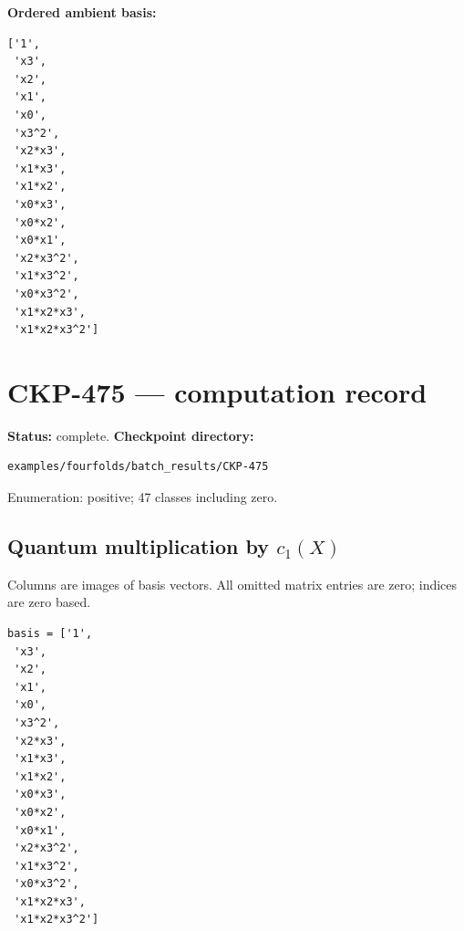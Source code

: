 \documentclass[10pt,a4paper]{article}
\begin{document}
\textbf{Ordered ambient basis:}
\begin{lstlisting}
['1',
 'x3',
 'x2',
 'x1',
 'x0',
 'x3^2',
 'x2*x3',
 'x1*x3',
 'x1*x2',
 'x0*x3',
 'x0*x2',
 'x0*x1',
 'x2*x3^2',
 'x1*x3^2',
 'x0*x3^2',
 'x1*x2*x3',
 'x1*x2*x3^2']
\end{lstlisting}

\clearpage\section*{CKP-475 --- computation record}
\textbf{Status:} complete.
\textbf{Checkpoint directory:}
\begin{lstlisting}
examples/fourfolds/batch_results/CKP-475
\end{lstlisting}

Enumeration: positive; 47 classes including zero.
\subsection*{Quantum multiplication by $c_1(X)$}
Columns are images of basis vectors. All omitted matrix entries are zero; indices are zero based.

\begin{lstlisting}
basis = ['1',
 'x3',
 'x2',
 'x1',
 'x0',
 'x3^2',
 'x2*x3',
 'x1*x3',
 'x1*x2',
 'x0*x3',
 'x0*x2',
 'x0*x1',
 'x2*x3^2',
 'x1*x3^2',
 'x0*x3^2',
 'x1*x2*x3',
 'x1*x2*x3^2']
\end{lstlisting}
\end{document}
